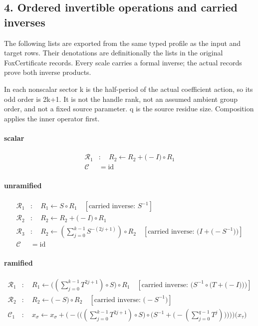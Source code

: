\subsection*{4. Ordered invertible operations and carried inverses}
The following lists are exported from the same typed profile as the input and target rows. Their denotations are definitionally the lists in the original FoxCertificate records. Every scale carries a formal inverse; the actual records prove both inverse products.

In each nonscalar sector k is the half-period of the actual coefficient action, so its odd order is 2k+1. It is not the handle rank, not an assumed ambient group order, and not a fixed source parameter. q is the source residue size. Composition applies the inner operator first.

\paragraph{scalar}
\[\begin{aligned}\mathcal R_{1}&:\quad R_2 \leftarrow R_2+\bigl(-I\bigr)\circ R_1\\\mathcal C&=\mathrm{id}\end{aligned}\]
\paragraph{unramified}
\[\begin{aligned}\mathcal R_{1}&:\quad R_1 \leftarrow S\circ R_1\quad[\text{carried inverse: }S^{-1}]\\\mathcal R_{2}&:\quad R_2 \leftarrow R_2+\bigl(-I\bigr)\circ R_1\\\mathcal R_{3}&:\quad R_2 \leftarrow \left(\sum_{j=0}^{k-1}S^{-(2j+1)}\right)\circ R_2\quad[\text{carried inverse: }\bigl(I+\bigl(-S^{-1}\bigr)\bigr)]\\\mathcal C&=\mathrm{id}\end{aligned}\]
\paragraph{ramified}
\[\begin{aligned}\mathcal R_{1}&:\quad R_1 \leftarrow \bigl(\left(\sum_{j=0}^{k-1}T^{2j+1}\right)\circ S\bigr)\circ R_1\quad[\text{carried inverse: }\bigl(S^{-1}\circ \bigl(T+\bigl(-I\bigr)\bigr)\bigr)]\\\mathcal R_{2}&:\quad R_2 \leftarrow \bigl(-S\bigr)\circ R_2\quad[\text{carried inverse: }\bigl(-S^{-1}\bigr)]\\\mathcal C_{1}&:\quad x_{\sigma}\leftarrow x_{\sigma}+\bigl(-\bigl(\bigl(\left(\sum_{j=0}^{k-1}T^{2j+1}\right)\circ S\bigr)\circ \bigl(S^{-1}+\bigl(-\left(\sum_{j=0}^{q-1}T^{j}\right)\bigr)\bigr)\bigr)\bigr)\bigl(x_{\tau}\bigr)\end{aligned}\]
